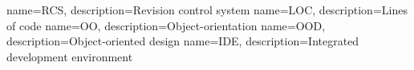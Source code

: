 \makeglossaries
{}
{
    name=RCS,
    description={Revision control system}
}
{
    name=LOC,
    description={Lines of code}
}
{
    name=OO,
    description={Object-orientation}
}
{
    name=OOD,
    description={Object-oriented design}
}
{
    name=IDE,
    description={Integrated development environment}
}